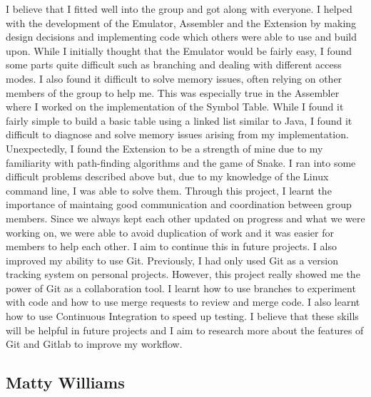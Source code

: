 \documentclass[11pt]{article}
\begin{document}
I believe that I fitted well into the group and got along with everyone. I helped with the development of the Emulator, Assembler and the Extension by 
making design decisions and implementing code which others were able to use and build upon. While I initially thought that the Emulator would be fairly easy, 
I found some parts quite difficult such as branching and dealing with different access modes. I also found it difficult to solve memory issues, often relying on 
other members of the group to help me. This was especially true in the Assembler where I worked on the implementation of the Symbol Table. While I found it fairly 
simple to build a basic table using a linked list similar to Java, I found it difficult to diagnose and solve memory issues arising from my implementation. 
Unexpectedly, I found the Extension to be a strength of mine due to my familiarity with path-finding algorithms and the game of Snake. I ran into some difficult 
problems described above but, due to my knowledge of the Linux command line, I was able to solve them.
\newline
Through this project, I learnt the importance of maintaing good communication and coordination between group members. Since we always kept each other updated 
on progress and what we were working on, we were able to avoid duplication of work and it was easier for members to help each other. I aim to continue this in 
future projects. I also improved my ability to use Git. Previously, I had only used Git as a version tracking system on personal projects. However, this project 
really showed me the power of Git as a collaboration tool. I learnt how to use branches to experiment with code and how to use merge requests to review and merge code. 
I also learnt how to use Continuous Integration to speed up testing. I believe that these skills will be helpful in future projects and I aim to research more about 
the features of Git and Gitlab to improve my workflow.

\subsection{Matty Williams}
\end{document}
